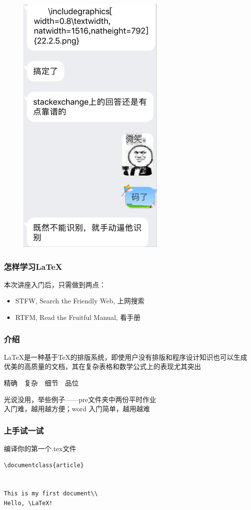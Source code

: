 \begin{frame}
\begin{figure}
\begin{minipage}[t]{0.48\textwidth}
    \includegraphics[width=0.65\textwidth]{img//xieyi2.png}
    \end{minipage}
    \end{figure}
\end{frame}

\begin{frame}
    \frametitle{怎样学习\LaTeX}
    本次讲座入门后，只需做到两点：
    \begin{itemize}
        \item STFW, Search the Friendly Web, 上网搜索
        \item RTFM, Read the Fruitful Manual, 看手册
    \end{itemize}
\end{frame}

\begin{frame}
    \frametitle{介绍}
    \LaTeX 是一种基于\TeX 的排版系统，即使用户没有排版和程序设计知识也可以生成优美的高质量的文档，其在复杂表格和数学公式上的表现尤其突出\\\pause
    \begin{center}
    精确\ \ 复杂\ \ 细节\ \ 品位
    \end{center}
    光说没用，举些例子——pre文件夹中两份平时作业\\\pause
     入门难，越用越方便；word 入门简单，越用越难
\end{frame}

\begin{frame}[fragile]
    \frametitle{上手试一试}
编译你的第一个.tex文件

\begin{lstlisting}
\documentclass{article}
   

This is my first document\\
Hello, \LaTeX!

\end{lstlisting}

\end{frame}